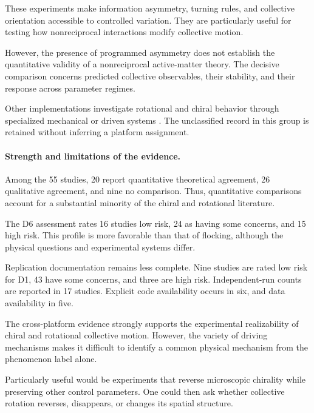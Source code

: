 These experiments make
information asymmetry,
turning rules, and
collective orientation
accessible to controlled
variation. They are
particularly useful
for testing how
nonreciprocal interactions
modify collective motion.

However, the presence
of programmed asymmetry
does not establish
the quantitative
validity of a
nonreciprocal
active-matter theory.
The decisive comparison
concerns predicted
collective observables,
their stability,
and their response
across parameter regimes.

Other implementations
investigate rotational
and chiral behavior
through specialized
mechanical or driven
systems
\cite{Li2024memoryinducedspont,Hu2026phototunablenonreci,Deng2022lightfuelednonreci,Zhou2025activesearchpromot,Ren2025chlamydomonasinspir,Leech2026spincoupledhydrody,Smith2025loopymovementseme,Wang2026oscillatingeelrobo,ICHIKAWA2004emergentbehaviorso,Fruchart2021nonreciprocalphase}.
The unclassified record
in this group is retained
without inferring a
platform assignment.

\paragraph*{Strength and limitations of the evidence.}

Among the 55 studies,
20 report quantitative
theoretical agreement,
26 qualitative agreement,
and nine no comparison.
Thus, quantitative
comparisons account
for a substantial
minority of the
chiral and rotational
literature.

The D6 assessment
rates 16 studies
low risk, 24 as
having some concerns,
and 15 high risk.
This profile is
more favorable
than that of
flocking, although
the physical questions
and experimental
systems differ.

Replication documentation
remains less complete.
Nine studies are
rated low risk for D1,
43 have some concerns,
and three are high risk.
Independent-run counts
are reported in
17 studies. Explicit
code availability
occurs in six,
and data availability
in five.



The cross-platform
evidence strongly supports
the experimental
realizability of
chiral and rotational
collective motion.
However, the variety
of driving mechanisms
makes it difficult
to identify a common
physical mechanism
from the phenomenon
label alone.



Particularly useful
would be experiments
that reverse microscopic
chirality while
preserving other
control parameters.
One could then ask
whether collective
rotation reverses,
disappears, or
changes its spatial
structure.

